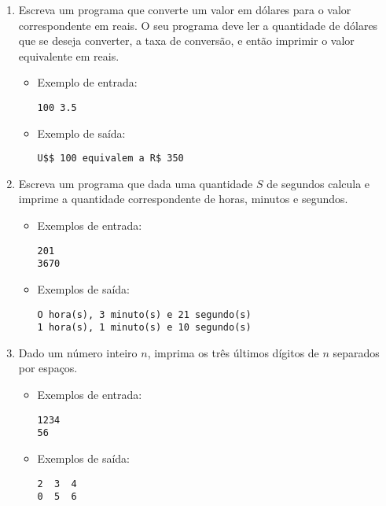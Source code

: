 \documentclass{report}
\begin{document}
\begin{enumerate}

\item Escreva um programa que converte um valor em dólares
	para o valor correspondente em reais. O seu programa deve
	ler a quantidade de dólares que se deseja converter, a taxa
	de conversão, e então imprimir o valor equivalente em reais.
\begin{itemize}
	\item Exemplo de entrada:
\begin{verbatim}
100 3.5
\end{verbatim}
	\item Exemplo de saída:
\begin{verbatim}
U$$ 100 equivalem a R$ 350 
\end{verbatim}
\end{itemize}


\item Escreva um programa que dada uma quantidade $S$ de
	segundos calcula e imprime a quantidade correspondente
	de horas, minutos e segundos.
\begin{itemize}
	\item Exemplos de entrada:
\begin{verbatim}
201
3670
\end{verbatim}
	\item Exemplos de saída:
\begin{verbatim}
O hora(s), 3 minuto(s) e 21 segundo(s) 
1 hora(s), 1 minuto(s) e 10 segundo(s)
\end{verbatim}
\end{itemize}

		\item Dado um número inteiro $n$, imprima
		os três últimos dígitos de $n$ separados
		por espaços.

\begin{itemize}
	\item Exemplos de entrada:
\begin{verbatim}
1234
56
\end{verbatim}

	\item Exemplos de saída:
\begin{verbatim}
2  3  4
0  5  6
\end{verbatim}
\end{itemize}


\end{enumerate}
\end{document}

